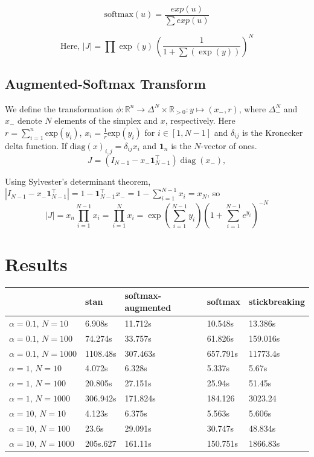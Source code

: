\documentclass[11pt]{article}
\newcommand{\abs}[1]{\left| #1 \right|}
\begin{document}
\[
  \textrm{softmax}(u) = \frac{exp(u)}{\sum exp(u)}
\]

\[
\textrm{Here, } \abs{J} = \prod \exp(y)
  \, \left( \frac{1}{1 + \sum(\exp(y))} \right)^N
\]
\subsection{Augmented-Softmax Transform}
We define the transformation
$\phi: \mathbb{R}^n \to \Delta^{N} \times \mathbb{R}_{>0}: y \mapsto
(x_-, r)$, where  $\Delta_{-}^N$ and $x_{-}$  denote $N$ elements of the simplex and $x$, respectively. Here $r = \sum_{i=1}^n \textrm{exp}(y_i)$,
$x_i = \frac{1}{r} \textrm{exp}(y_i)$ for $i \in [1, N-1]$ and $\delta_{ij}$ is the Kronecker delta function. If $\mathrm{diag}(x)_{i, j} = \delta_{ij} x_i$ and $\boldsymbol{1}_n$ is the $N$-vector of ones.\[
  J = (I_{N-1} - x_- \boldsymbol{1}_{N-1}^\top) \operatorname{diag}(x_-),
\] 

Using Sylvester's determinant theorem,
$|I_{N-1} - x_- \boldsymbol{1}_{N-1}^\top| = 1 -
\boldsymbol{1}_{N-1}^\top x_- = 1 - \sum_{i=1}^{N-1} x_i = x_N$, so
$$ |J| = x_n \prod_{i=1}^{N-1} x_i = \prod_{i=1}^{N} x_i = \exp\left(\sum_{i=1}^{N-1} y_i\right) \left(1 + \sum_{i=1}^{N-1} e^{y_i}\right)^{-N}$$

\section{Results}

\begin{table}[!ht]
    \centering
    \begin{tabular}{|l|l|l|l|l|}
    \hline
        ~ & stan & softmax-augmented & softmax & stickbreaking \\ \hline
        $\alpha = 0.1, \, N = 10$ & 6.908s & 11.712s & 10.548s & 13.386s \\ 
        $\alpha = 0.1, \, N = 100$ & 74.274s & 33.757s & 61.826s & 159.016s \\ 
        $\alpha = 0.1, \, N = 1000$ & 1108.48s & 307.463s & 657.791s & 11773.4s \\ 
        $\alpha = 1, \, N = 10$ & 4.072s & 6.328s & 5.337s & 5.67s \\ 
        $\alpha = 1, \, N = 100$ & 20.805s & 27.151s & 25.94s & 51.45s \\ 
        $\alpha = 1, \, N = 1000$ & 306.942s & 171.824s & 184.126 & 3023.24 \\ 
        $\alpha = 10, \, N = 10$ & 4.123s & 6.375s & 5.563s & 5.606s \\ 
        $\alpha = 10, \, N = 100$ & 23.6s & 29.091s & 30.747s & 48.834s \\ 
        $\alpha = 10, \, N = 1000$ & 205s.627 & 161.11s & 150.751s & 1866.83s \\ \hline
    \end{tabular}
\end{table}
\end{document}
